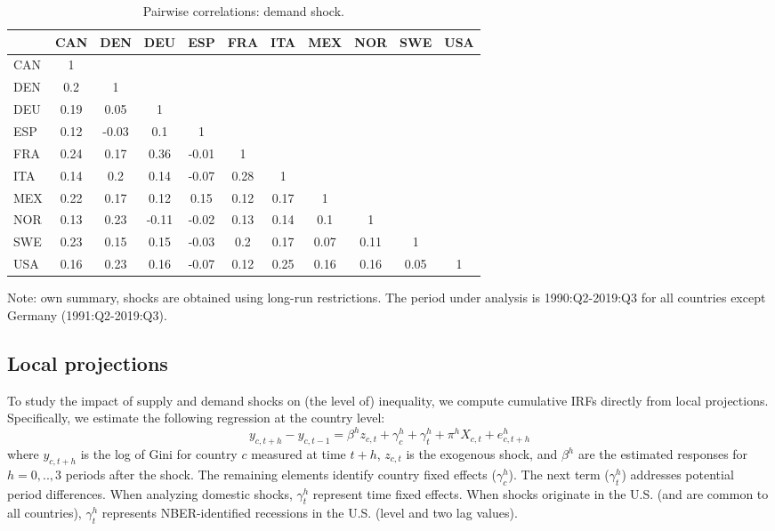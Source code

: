 \documentclass[12pt, a4paper]{article}
\begin{document}
\begin{table}[H]
\captionsetup{justification=raggedright,
singlelinecheck=false
}
    \centering
    \caption{Pairwise correlations: demand shock.}
    \begin{tabular}{l ccc ccc ccc c}
    \toprule
& CAN & DEN & DEU & ESP & FRA & ITA & MEX & NOR & SWE & USA \\ 
  \hline
  CAN & 1 &  &  &  &  &  &  &  &  &  \\ 
  DEN & 0.2 & 1 &  &  &  &  &  &  &  &  \\ 
  DEU & 0.19 & 0.05 & 1 &  &  &  &  &  &  &  \\ 
  ESP & 0.12 & -0.03 & 0.1 & 1 &  &  &  &  &  &  \\ 
  FRA & 0.24 & 0.17 & 0.36 & -0.01 & 1 &  &  &  &  &  \\ 
  ITA & 0.14 & 0.2 & 0.14 & -0.07 & 0.28 & 1 &  &  &  &  \\ 
  MEX & 0.22 & 0.17 & 0.12 & 0.15 & 0.12 & 0.17 & 1 &  &  &  \\ 
  NOR & 0.13 & 0.23 & -0.11 & -0.02 & 0.13 & 0.14 & 0.1 & 1 &  &  \\ 
  SWE & 0.23 & 0.15 & 0.15 & -0.03 & 0.2 & 0.17 & 0.07 & 0.11 & 1 &  \\ 
  USA & 0.16 & 0.23 & 0.16 & -0.07 & 0.12 & 0.25 & 0.16 & 0.16 & 0.05 & 1 \\ 
    \bottomrule
    \end{tabular}
    \begin{minipage}{\textwidth}
    \vspace{0.1cm}
    \footnotesize Note: own summary, shocks are obtained using long-run restrictions. The period under analysis is 1990:Q2-2019:Q3 for all countries except Germany (1991:Q2-2019:Q3).
    \end{minipage}
    \label{table:a3}
\end{table}


\subsection{Local projections} 
To study the impact of supply and demand shocks on (the level of) inequality, we compute cumulative IRFs directly from local projections. Specifically, we estimate the following regression at the country level:
\begin{equation}
    y_{c,t+h}-y_{c,t-1} =  \beta^h z_{c,t} + \gamma^h_c + \gamma^h_t + \pi^h X_{c,t} + e^h_{c, t+h}
\label{eq:1}
\end{equation}
\noindent where $y_{c,t+h}$ is the log of Gini for country $c$ measured at time $t+h$, $z_{c,t}$ is the exogenous shock, and $\beta^h$ are the estimated responses for $h = 0,..,3$ periods after the shock. The remaining elements identify country fixed effects ($\gamma^h_c$). The next term  ($\gamma^h_t$) addresses potential period differences. When analyzing domestic shocks, $\gamma^h_t$ represent time fixed effects. When shocks originate in the U.S. (and are common to all countries), $\gamma^h_t$ represents NBER-identified recessions in the U.S. (level and two lag values).
\end{document}
